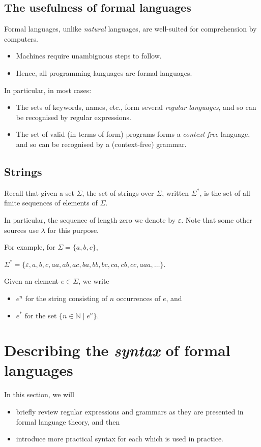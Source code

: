 \documentclass[11pt]{article}
\theoremstyle{definition}
\begin{document}
\subsection{The usefulness of formal languages}
\label{sec:org6284c09}
Formal languages, unlike \emph{natural} languages, are well-suited
for comprehension by computers.
\begin{itemize}
\item Machines require unambiguous steps to follow.
\item Hence, all programming languages are formal languages.
\end{itemize}

In particular, in most cases:
\begin{itemize}
\item The sets of keywords, names, etc., form several \emph{regular languages},
and so can be recognised by regular expressions.
\item The set of valid (in terms of form) programs forms
a \emph{context-free} language, and so can be recognised by
a (context-free) grammar.
\end{itemize}

\subsection{Strings}
\label{sec:org382e0c9}
Recall that given a set \(Σ\), the set of strings over \(Σ\),
written \(Σ^{*}\), is the set of all finite sequences
of elements of \(Σ\).

In particular, the sequence of length zero we denote by \(ε\).
Note that some other sources use \(λ\) for this purpose.

For example, for \(Σ = \{a, b, c\}\),
\begin{center}
\(Σ^{*} = \{ε, a, b, c, aa, ab, ac, ba, bb, bc, ca, cb, cc, aaa, …\}\).
\end{center}

Given an element \(e ∈ Σ\), we write
\begin{itemize}
\item \(e^{n}\) for the string consisting of \(n\) occurrences of \(e\), and
\item \(e^{*}\) for the set \(\{ n ∈ ℕ ∣ e^{n} \}\).
\end{itemize}

\section{Describing the \emph{syntax} of formal languages}
\label{sec:org30490de}
In this section, we will
\begin{itemize}
\item briefly review regular expressions and grammars as
they are presented in formal language theory, and then
\item introduce more practical syntax for each
which is used in practice.
\end{itemize}
\end{document}
